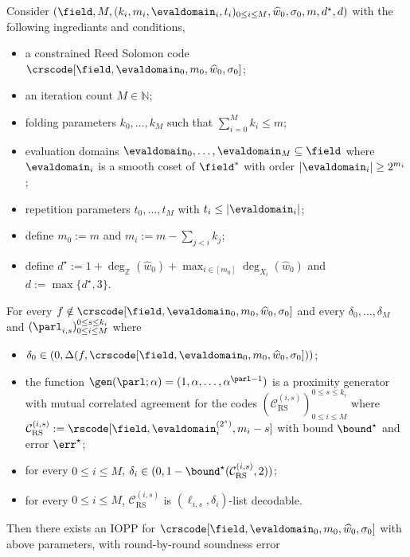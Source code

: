 \begin{theorem}\label{thm: whir_rbr_soundness}
    Consider $(\field, M, (k_i, m_i, \evaldomain_i, t_i)_{0 \leq i \leq M}, \widehat{w}_0, \sigma_0, m, d^\star, d)$ with the following ingrediants and conditions,
    \begin{itemize}
    \item a constrained Reed Solomon code $\crscode[\field, \evaldomain_0, m_0, \widehat{w}_0, \sigma_0]$;
    \item an iteration count $M \in \mathbb{N}$;
    \item folding parameters $k_0, \ldots, k_{M}$ such that $\sum_{i=0}^{M} k_i \leq m$;
    \item evaluation domains $\evaldomain_0, \ldots, \evaldomain_{M} \subseteq \field$ where $\evaldomain_i$ is a smooth coset of $\field^*$ with order $|\evaldomain_i| \geq 2^{m_i}$;
    \item repetition parameters $t_0, \ldots, t_M$ with $t_i \leq |\evaldomain_i|$;
    \item define $m_0 := m$ and $m_i := m - \sum_{j < i} k_j$;
    \item define $d^\star := 1 + \deg_{\mathbb{Z}}(\widehat{w}_0) + \max_{i \in [m_0]} \deg_{X_i}(\widehat{w}_0)$ and $d := \max\{d^\star, 3\}$.
    \end{itemize}
    For every $f \notin \crscode[\field, \evaldomain_0, m_0, \widehat{w}_0, \sigma_0]$ and every $\delta_0, \dots, \delta_{M}$ and $(\parl_{i,s})_{0 \leq i \leq M}^{0 \leq s \leq k_i}$ where
    \begin{itemize}
        \item $\delta_0 \in (0, \Delta(f, \crscode[\field, \evaldomain_0, m_0, \widehat{w}_0, \sigma_0]))$;
        \item the function $\gen(\parl; \alpha) = (1, \alpha, \dots, \alpha^{\parl-1})$ is a proximity generator with mutual correlated agreement for the codes $(\mathcal{C}_{\mathrm{RS}}^{(i,s)})_{0 \leq i \leq M}^{0 \leq s \leq k_i}$ where $\mathcal{C}_{\mathrm{RS}}^{(i,s)} := \rscode[\field, \evaldomain_i^{(2^s)}, m_i - s]$ with bound ${\bound}^\star$ and error $\err^\star$;
        \item for every $0 \leq i \le M$, $\delta_i \in (0, 1 - {\bound}^\star(\mathcal{C}_{\mathrm{RS}}^{(i,s)}, 2))$;
        \item for every $0 \leq i \le M$, $\mathcal{C}_{\mathrm{RS}}^{(i,s)}$ is $(\ell_{i,s}, \delta_i)$-list decodable.
    \end{itemize}
   Then there exists an IOPP for $\crscode[\field, \evaldomain_0, m_0, \widehat{w}_0, \sigma_0]$ with above parameters, with round-by-round soundness error


\end{theorem}
